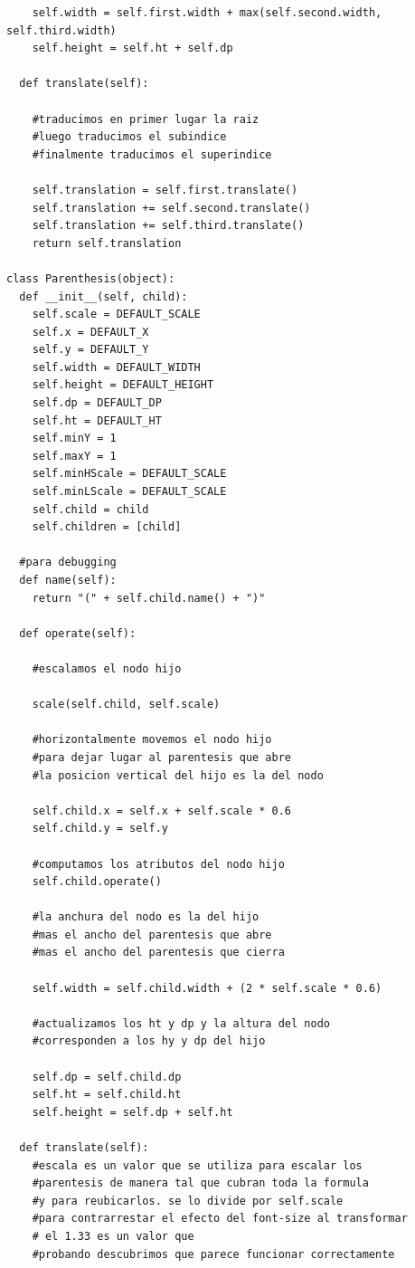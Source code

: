 \begin{verbatim}
    self.width = self.first.width + max(self.second.width, self.third.width)
    self.height = self.ht + self.dp

  def translate(self):

    #traducimos en primer lugar la raiz
    #luego traducimos el subindice
    #finalmente traducimos el superindice
    
    self.translation = self.first.translate()
    self.translation += self.second.translate()
    self.translation += self.third.translate()
    return self.translation    

class Parenthesis(object):
  def __init__(self, child):
    self.scale = DEFAULT_SCALE
    self.x = DEFAULT_X
    self.y = DEFAULT_Y
    self.width = DEFAULT_WIDTH
    self.height = DEFAULT_HEIGHT
    self.dp = DEFAULT_DP
    self.ht = DEFAULT_HT
    self.minY = 1
    self.maxY = 1
    self.minHScale = DEFAULT_SCALE
    self.minLScale = DEFAULT_SCALE
    self.child = child
    self.children = [child]
  
  #para debugging  
  def name(self):
    return "(" + self.child.name() + ")"

  def operate(self):

    #escalamos el nodo hijo
    
    scale(self.child, self.scale)

    #horizontalmente movemos el nodo hijo 
    #para dejar lugar al parentesis que abre
    #la posicion vertical del hijo es la del nodo
    
    self.child.x = self.x + self.scale * 0.6
    self.child.y = self.y

    #computamos los atributos del nodo hijo
    self.child.operate()

    #la anchura del nodo es la del hijo 
    #mas el ancho del parentesis que abre 
    #mas el ancho del parentesis que cierra
    
    self.width = self.child.width + (2 * self.scale * 0.6)

    #actualizamos los ht y dp y la altura del nodo
    #corresponden a los hy y dp del hijo
    
    self.dp = self.child.dp 
    self.ht = self.child.ht  
    self.height = self.dp + self.ht

  def translate(self):
    #escala es un valor que se utiliza para escalar los 
    #parentesis de manera tal que cubran toda la formula 
    #y para reubicarlos. se lo divide por self.scale 
    #para contrarrestar el efecto del font-size al transformar
    # el 1.33 es un valor que 
    #probando descubrimos que parece funcionar correctamente 


\end{verbatim}
